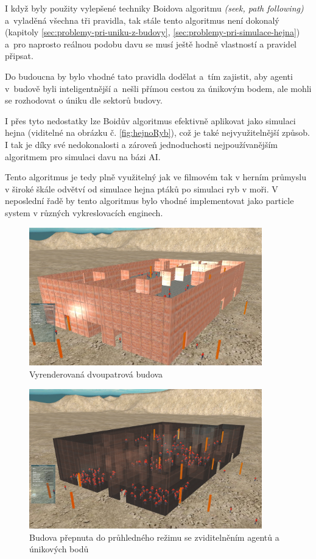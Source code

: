 \documentclass[czech,public,dept460,male,cpdeclaration]{diploma}
\begin{document}
I když byly použity vylepšené techniky Boidova algoritmu \textit{(seek, path following)} a~vyladěná všechna tři pravidla, tak stále tento algoritmus není dokonalý (kapitoly \ref{sec:problemy-pri-uniku-z-budovy}, \ref{sec:problemy-pri-simulace-hejna}) a~pro naprosto reálnou podobu davu se musí ještě hodně vlastností a pravidel připsat.

Do budoucna by bylo vhodné tato pravidla dodělat a~tím zajistit, aby agenti v~budově byli inteligentnější a~nešli přímou cestou za únikovým bodem, ale mohli se rozhodovat o úniku dle sektorů budovy.

I přes tyto nedostatky lze Boidův algoritmus efektivně aplikovat jako simulaci hejna (viditelné na obrázku č. \ref{fig:hejnoRyb}), což je také nejvyužitelnější způsob. I tak je díky své nedokonalosti a zároveň jednoduchosti nejpoužívanějším algoritmem pro simulaci davu na bázi AI.

Tento algoritmus je tedy plně využitelný jak ve filmovém tak v herním průmyslu v široké škále odvětví od simulace hejna ptáků po simulaci ryb v moři. V neposlední řadě by tento algoritmus bylo vhodné implementovat jako particle system \cite{linkToUnity} v různých vykreslovacích enginech.

\newpage

\begin{figure}[H]\centering\includegraphics[width=0.9\textwidth]{Figures/screen8.jpg}
	\caption{Vyrenderovaná dvoupatrová budova}
\end{figure}

\begin{figure}[H]\centering\includegraphics[width=0.9\textwidth]{Figures/screen6.jpg}
	\caption{Budova přepnuta do průhledného režimu se zviditelněním agentů a únikových bodů}
\end{figure}
\end{document}
